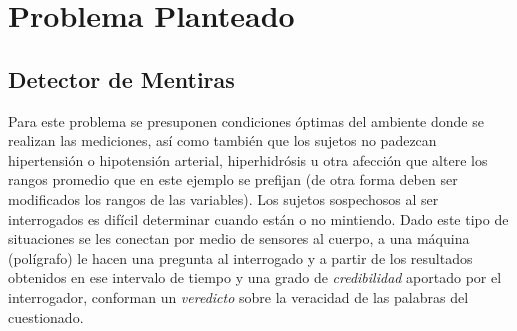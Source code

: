\documentclass[a4paper,10pt,twocolumn]{article}
\begin{document}
 \section{Problema Planteado}
 \subsection{Detector de Mentiras}	
  Para este problema se presuponen condiciones \'optimas del ambiente donde se realizan las mediciones, as\'i como tambi\'en que los sujetos no padezcan hipertensi\'on o hipotensi\'on arterial, hiperhidr\'osis u otra afecci\'on que altere los rangos promedio que en este ejemplo se prefijan (de otra forma deben ser modificados los rangos de las variables). Los sujetos sospechosos al ser interrogados es dif\'icil determinar cuando est\'an o no mintiendo. Dado este tipo de situaciones se les conectan por medio de sensores al cuerpo, a una m\'aquina (pol\'igrafo) le hacen una pregunta al interrogado y a partir de los resultados obtenidos en ese intervalo de tiempo y una grado de \textit{credibilidad} aportado por el interrogador, conforman un \textit{veredicto} sobre la veracidad de las palabras del cuestionado.
  
\end{document}

